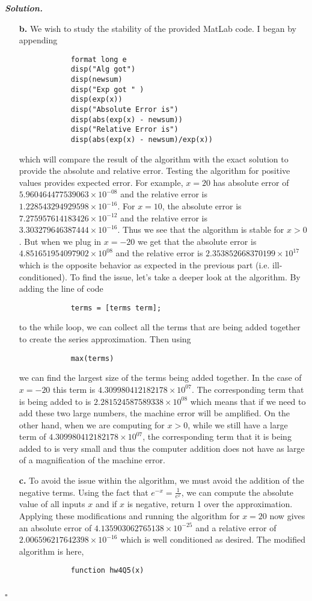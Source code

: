 \documentclass[12pt]{report}
\newenvironment{solution}[1][\it{Solution}]{\textbf{#1. } }{$\square$}
\begin{document}
\begin{solution}
\begin{enumerate}
        \item [{\bf b.}]
        We wish to study the stability of the provided MatLab code. I began by appending
        \begin{verbatim}
            format long e
            disp("Alg got")
            disp(newsum)
            disp("Exp got " )
            disp(exp(x))
            disp("Absolute Error is")
            disp(abs(exp(x) - newsum))
            disp("Relative Error is")
            disp(abs(exp(x) - newsum)/exp(x))
        \end{verbatim}
        which will compare the result of the algorithm with the exact solution to provide the absolute and relative error. Testing the algorithm for positive values provides expected error. For example, $x = 20$ has absolute error of $5.960464477539063 \times 10^{-08}$ and the  relative error is $1.228543294929598 \times 10^{-16}$.  For $x = 10$, the absolute error is $7.275957614183426 \times 10^{-12}$ and the relative error is $3.303279646387444 \times 10^{-16}$. Thus we see that the algorithm is stable for $x > 0$. But when we plug in $x=-20$ we get that the absolute error is $4.851651954097902 \times 10^{08}$ and the relative error is $2.353852668370199 \times 10^{17}$ which is the opposite behavior as expected in the previous part (i.e. ill-conditioned). To find the issue, let's take a deeper look at the algorithm. By adding the line of code
        \begin{verbatim}
            terms = [terms term];
        \end{verbatim}
        to the while loop, we can collect all the terms that are being added together to create the series approximation. Then using 
        \begin{verbatim}
            max(terms)
        \end{verbatim}
        we can find the largest size of the terms being added together. In the case of $x = -20$ this term is $4.309980412182178 \times 10^{07}$. The corresponding term that is being added to is $2.281524587589338 \times 10^{08}$ which means that if we need to add these two large numbers, the machine error will be amplified. On the other hand, when we are computing for $x>0$, while we still have a large term of $4.309980412182178 \times 10^{07}$, the corresponding term that it is being added to is very small and thus the computer addition does not have as large of a magnification of the machine error.  


        \item[{\bf c.}]
        To avoid the issue within the algorithm, we must avoid the addition of the negative terms. Using the fact that $e^{-x} = \frac{1}{e^x}$, we can compute the absolute value of all inputs $x$ and if $x$ is negative, return 1 over the approximation. Applying these modifications and running the algorithm for $x = 20$ now gives an absolute error of $4.135903062765138\times 10^{-25}$ and a relative error of $2.006596217642398\times 10^{-16}$ which is well conditioned as desired. The modified algorithm is here,
        \begin{verbatim}
            function hw4Q5(x)


\end{verbatim}
\end{enumerate}
\end{solution}
\end{document}

